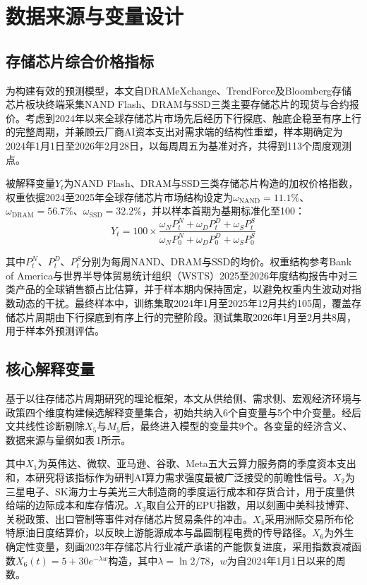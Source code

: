\documentclass[a4paper,12pt,fontset=fandol]{ctexart}
\begin{document}
\section{数据来源与变量设计}

\subsection{存储芯片综合价格指标}

为构建有效的预测模型，本文自DRAMeXchange、TrendForce及Bloomberg存储芯片板块终端采集NAND Flash、DRAM与SSD三类主要存储芯片的现货与合约报价。考虑到2024年以来全球存储芯片市场先后经历下行探底、触底企稳至有序上行的完整周期，并兼顾云厂商AI资本支出对需求端的结构性重塑，样本期确定为2024年1月1日至2026年2月28日，以每周周五为基准对齐，共得到113个周度观测点。

被解释变量$Y_t$为NAND Flash、DRAM与SSD三类存储芯片构造的加权价格指数，权重依据2024至2025年全球存储芯片市场结构设定为$\omega_{\text{NAND}}=11.1\%$、$\omega_{\text{DRAM}}=56.7\%$、$\omega_{\text{SSD}}=32.2\%$，并以样本首期为基期标准化至100：
\begin{equation}
Y_t = 100 \times \frac{\omega_N P_t^N + \omega_D P_t^D + \omega_S P_t^S}{\omega_N P_0^N + \omega_D P_0^D + \omega_S P_0^S}
\end{equation}

其中$P_t^N$、$P_t^D$、$P_t^S$分别为每周NAND、DRAM与SSD的均价。权重结构参考Bank of America与世界半导体贸易统计组织（WSTS）2025至2026年度结构报告中对三类产品的全球销售额占比估算，并于样本期内保持固定，以避免权重内生波动对指数动态的干扰。最终样本中，训练集取2024年1月至2025年12月共约105周，覆盖存储芯片周期由下行探底到有序上行的完整阶段。测试集取2026年1月至2月共8周，用于样本外预测评估。


\subsection{核心解释变量}

基于以往存储芯片周期研究的理论框架，本文从供给侧、需求侧、宏观经济环境与政策四个维度构建候选解释变量集合，初始共纳入6个自变量与5个中介变量。经后文共线性诊断剔除$X_5$与$M_5$后，最终进入模型的变量共9个。各变量的经济含义、数据来源与量纲如表\,1所示。

其中$X_1$为英伟达、微软、亚马逊、谷歌、Meta五大云算力服务商的季度资本支出和，本研究将该指标作为研判AI算力需求强度最被广泛接受的前瞻性信号。$X_2$为三星电子、SK海力士与美光三大制造商的季度运行成本和存货合计，用于度量供给端的边际成本和库存情况。$X_3$取自公开的EPU指数，用以刻画中美科技博弈、关税政策、出口管制等事件对存储芯片贸易条件的冲击。$X_4$采用洲际交易所布伦特原油日度结算价，以反映上游能源成本与晶圆制程电费的传导路径。$X_6$为外生确定性变量，刻画2023年存储芯片行业减产承诺的产能恢复进度，采用指数衰减函数$X_6(t)=5+30e^{-\lambda w}$构造，其中$\lambda = \ln 2/78$，$w$为自2024年1月1日以来的周数。
\end{document}
